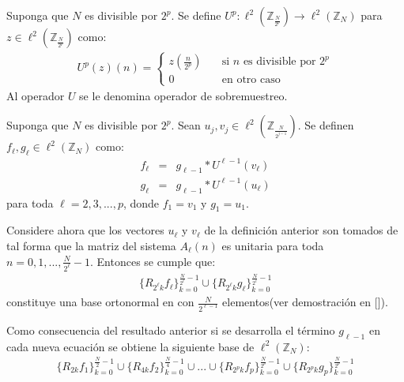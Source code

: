 \begin{definition}
Suponga que $N$ es divisible por $2^p$. Se define $U^p:\ell^2(\mathbb{Z}_{\frac{N}{2^p}})\rightarrow\ell^2(\mathbb{Z}_N)$ para $z\in\ell^2(\mathbb{Z}_{\frac{N}{2^p}})$ como:
\begin{eqnarray}
U^p(z)(n)=\left\{\begin{array}{ll}
z\left(\frac{n}{2^p}\right)&\quad\mbox{si $n$ es divisible por $2^p$}\\
0&\quad\mbox{en otro caso}
\end{array}\right.\nonumber
\end{eqnarray}
Al operador $U$ se le denomina operador de sobremuestreo.
\end{definition}

\begin{definition}
Suponga que $N$ es divisible por $2^p$. Sean $u_j,v_j\in\ell^2(\mathbb{Z}_{\frac{N}{2^{j-1}}})$. Se definen $f_{\ell},g_{\ell}\in\ell^2(\mathbb{Z}_N)$ como:
\begin{eqnarray}
f_{\ell}&=&g_{\ell-1}\ast U^{\ell-1}(v_{\ell})\nonumber\\
g_{\ell}&=&g_{\ell-1}\ast U^{\ell-1}(u_{\ell})\nonumber
\end{eqnarray}
para toda $\ell=2,3,...,p$, donde $f_1=v_1$ y $g_1=u_1$.
\end{definition}

\par Considere ahora que los vectores $u_{\ell}$ y $v_{\ell}$ de la definici\'on anterior son tomados de tal forma que la matriz del sistema $A_{\ell}(n)$ es unitaria para toda $n=0,1,...,\frac{N}{2^{\ell}}-1$. Entonces se cumple que:
\begin{eqnarray}
\{R_{2^{\ell}k}f_{\ell}\}_{k=0}^{\frac{N}{2^{\ell}}-1}\cup\{R_{2^{\ell}k}g_{\ell}\}_{k=0}^{\frac{N}{2^{\ell}}-1}\nonumber
\end{eqnarray}
constituye una base ortonormal en con $\frac{N}{2^{\ell-1}}$ elementos(ver demostraci\'on en [\textcolor{cyan}{\cite{9}}]).

\par Como consecuencia del resultado anterior si se desarrolla el t\'ermino $g_{\ell-1}$ en cada nueva ecuaci\'on se obtiene la siguiente base de $\ell^2(\mathbb{Z}_N)$:
\begin{eqnarray}
\{R_{2k}f_1\}_{k=0}^{\frac{N}{2}-1}\cup\{R_{4k}f_2\}_{k=0}^{\frac{N}{4}-1}\cup ...\cup\{R_{2^{p}k}f_{p}\}_{k=0}^{\frac{N}{2^{p}}-1}\cup\{R_{2^{p}k}g_{p}\}_{k=0}^{\frac{N}{2^{p}}-1}\nonumber
\end{eqnarray}

